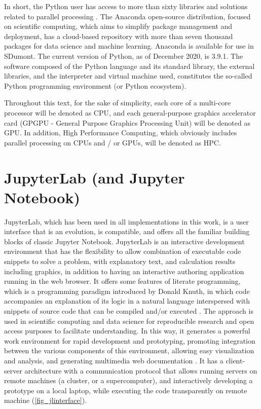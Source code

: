In short, the Python user has access to more than sixty libraries and solutions related to parallel processing \cite {Palach2014}. The Anaconda open-source distribution, focused on scientific computing, which aims to simplify package management and deployment, has a cloud-based repository with more than seven thousand packages for data science and machine learning. Anaconda is available for use in SDumont. The current version of Python, as of December 2020, is 3.9.1. The software composed of the Python language and its standard library, the external libraries, and the interpreter and virtual machine used, constitutes the so-called Python programming environment (or Python ecosystem).

Throughout this text, for the sake of simplicity, each core of a multi-core processor will be denoted as CPU, and each general-purpose graphics accelerator card (GPGPU - General Purpose Graphics Processing Unit) will be denoted as GPU.  In addition, High  Performance  Computing,  which obviously includes parallel processing on CPUs and / or GPUs, will be denoted as HPC.

%
%
%
\section{JupyterLab (and Jupyter Notebook)}
\label{sec_jupyterlab}

JupyterLab, which has been used in all implementations in this work, is a user interface that is an evolution, is compatible, and offers all the familiar building blocks of classic Jupyter Notebook. JupyterLab is an interactive development environment that has the flexibility to allow combination of executable code snippets to solve a problem, with explanatory text, and calculation results including graphics, in addition to having an interactive authoring application running in the web browser. It offers some features of literate programming, which is a programming paradigm introduced by Donald Knuth, in which code accompanies an explanation of its logic in a natural language interspersed with snippets of source code that can be compiled and/or executed \cite {Knuth1992}. The approach is used in scientific computing and data science for reproducible research and open access purposes to facilitate understanding. In this way, it generates a powerful work environment for rapid development and prototyping, promoting integration between the various components of this environment, allowing easy visualization and analysis, and generating multimedia web documentation \cite {Perkel2018}. It has a client-server architecture with a communication protocol that allows running servers on remote machines (a cluster, or a supercomputer), and interactively developing a prototype on a local laptop, while executing the code transparently on remote machine (\autoref {fig_jlinterface}).


